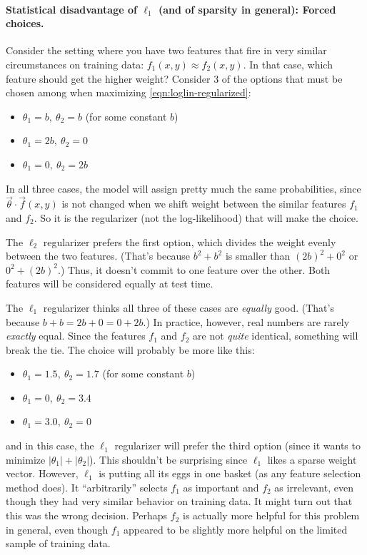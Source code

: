 \documentclass[11pt]{article}
\newcommand{\vtheta}{\vec{\theta}}
\begin{document}
\paragraph{Statistical disadvantage of $\ell_1$ (and of sparsity in general): Forced choices.}\label{sec:eggs}
Consider the setting where you have two features that fire in very similar circumstances on training data: $f_1(x,y) \approx f_2(x,y)$.  In that case, which feature should get
the higher weight?  Consider 3 of the options that must be chosen among when maximizing \eqref{eqn:loglin-regularized}:
\begin{itemize}[noitemsep]
\item $\theta_1=b,\ \theta_2=b$  (for some constant $b$)
\item $\theta_1=2b,\ \theta_2=0$
\item $\theta_1=0,\ \theta_2=2b$
\end{itemize}
In all three cases, the model will assign pretty much the same
probabilities, since $\vtheta \cdot \vec{f}(x,y)$ is not changed when
we shift weight between the similar features $f_1$ and $f_2$.  So it
is the regularizer (not the log-likelihood) that will make the choice.

The $\ell_2$ regularizer prefers the first option, which divides the weight evenly between the two features.  (That's because $b^2+b^2$ is smaller than $(2b)^2+0^2$ or $0^2+(2b)^2$.)  Thus, it doesn't commit to one feature over the other.  Both features will be considered equally at test time.

The $\ell_1$ regularizer thinks all three of these cases are {\em equally} good.  (That's because $b+b = 2b+0 = 0+2b$.)  In practice, however, real numbers are rarely {\em exactly} equal.  Since the features $f_1$ and $f_2$ are not {\em quite} identical, something will break the tie.  The choice will probably be more like this:
\begin{itemize}[noitemsep]
\item $\theta_1=1.5,\ \theta_2=1.7$  (for some constant $b$)
\item $\theta_1=0,\ \theta_2=3.4$
\item $\theta_1=3.0,\ \theta_2=0$
\end{itemize}
and in this case, the $\ell_1$ regularizer will prefer the third option (since it wants to minimize $|\theta_1|+|\theta_2|$).  This shouldn't be surprising since $\ell_1$ likes a sparse weight vector.  However, $\ell_1$ is putting all its eggs in one basket (as any feature selection method does).  It ``arbitrarily'' selects $f_1$ as important and $f_2$ as irrelevant, even though they had very similar behavior on training data.  It might turn out that this was the wrong decision.  Perhaps $f_2$ is actually more helpful for this problem in general, even though $f_1$ appeared to be slightly more helpful on the limited sample of training data.
\end{document}
